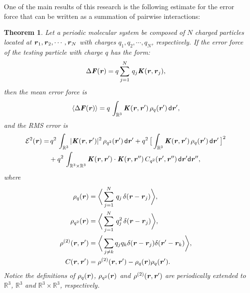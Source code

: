 \documentclass[journal=jacsat,manuscript=article]{achemso}
\newcommand{\redc}[1]{{\color{black} #1}}
\renewcommand{\v}[1]{\textbf{\textit{#1}}}
\renewcommand{\d}[1]{\textsf{#1}}
\newtheorem{theorem}{Theorem}
\begin{document}
One of the main results of this research is the \redc{following} estimate for
the error force that can be written as a summation of
pairwise interactions:
\begin{theorem}\label{thm:tmp1}
  Let a periodic molecular system be composed of $N$ charged particles
  located at $\v r_1, \v r_2, \cdots, \v r_N$ with charges $q_1, q_2,
  \cdots, q_N$, respectively.
  If the error force of the testing particle with charge $q$ has the form:
  \begin{align}\label{eqn:thm-error-force}
    \Delta \v F(\v r) =
    q\sum_{j=1}^N\,q_j \v K(\v r, \v r_j),
  \end{align}
  then the mean error force is
  \begin{align}\label{eqn:thm-meanf}
    \langle\Delta\v F(\v r)\rangle
    =q\, \int_{\mathbb R^3}\v K (\v r,\v r')\,\rho_q(\v r')\,\d d\v r',
  \end{align}
  and the RMS error is
  \begin{align}\nonumber
    \mathcal E^2 (\v r) 
    = &\,
    q^2\,\int_{\mathbb R^3}\vert\v K(\v r,\v r')\vert^2\,\rho_{q^2} (\v r')\,\d d\v r' + 
    q^2\,
    \big[
    \int_{\mathbb R^3}\v K(\v r,\v r')\,\rho_{q}(\v r')\,\d d\v r'
    \,\big]^2
    \\\label{eqn:thm-error}
    &+
    q^2\,\int_{\mathbb R^3\times\mathbb R^3}
    \v K(\v r,\v r')\cdot
    \v K(\v r,\v r'')\,
    C_{q^2}(\v r', \v r'')\,
    \d d\v r'\d d\v r'',
  \end{align}
  where
  \begin{align}\label{eqn:def-rhoq}
    \rho_q(\v r)
    &= 
    \bigg\langle
    \sum_{j = 1}^N
    \,q_j\,\delta(\v r - \v r_j)
    \bigg\rangle,\\\label{eqn:def-rhoq2}
    \rho_{q^2}(\v r)
    &= 
    \bigg\langle
    \sum_{j = 1}^N
    \,q^2_j\,\delta(\v r - \v r_j)
    \bigg\rangle,\\\label{eqn:def-rho2}
    \rho^{(2)}(\v r, \v r')
    &= 
    \bigg\langle
    \sum_{j\neq k}
    q_jq_k\delta(\v r-\v r_j)\delta(\v r'-\v r_k)
    \bigg\rangle,\\\label{eqn:def-c}
    C(\v r, \v r')
    &=
    \rho^{(2)}(\v r, \v r')    
    - \rho_q(\v r)\rho_q(\v r').
  \end{align}
  Notice the definitions of $\rho_q(\v r)$, $\rho_{q^2}(\v r)$ and
  $\rho^{(2)}(\v r, \v r')$ are periodically extended to
  $\mathbb{R}^3$, $\mathbb{R}^3$ and $\mathbb{R}^3\times\mathbb R^3$,
  respectively.
\end{theorem}
\end{document}

